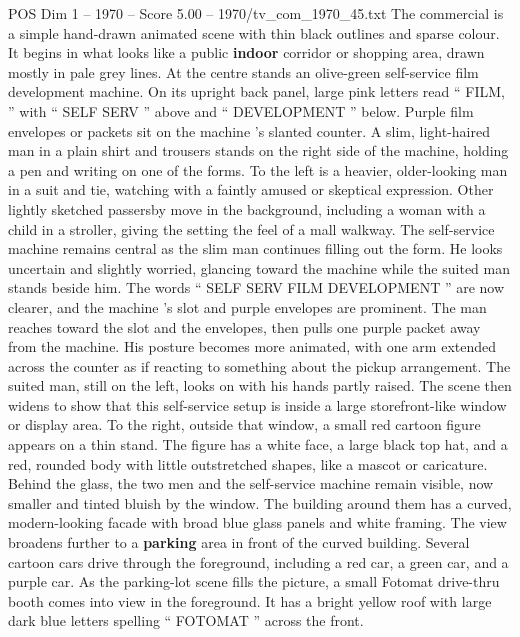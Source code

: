 \begin{textsample}{POS Dim 1 – 1970 – Score 5.00 – 1970/tv\_com\_1970\_45.txt}  \label{ex:f1_pos_067}
The commercial is a simple hand-drawn animated scene with thin black outlines and sparse colour.
It begins in what looks like a public \textbf{indoor} corridor or shopping area, drawn mostly in pale grey lines.
At the centre stands an olive-green self-service film development machine.
On its upright back panel, large pink letters read “ FILM, ” with “ SELF SERV ” above and “ DEVELOPMENT ” below.
Purple film envelopes or packets sit on the machine ’s slanted counter.
A slim, light-haired man in a plain shirt and trousers stands on the right side of the machine, holding a pen and writing on one of the forms.
To the left is a heavier, older-looking man in a suit and tie, watching with a faintly amused or skeptical expression.
Other lightly sketched passersby move in the background, including a woman with a child in a stroller, giving the setting the feel of a mall walkway.
The self-service machine remains central as the slim man continues filling out the form.
He looks uncertain and slightly worried, glancing toward the machine while the suited man stands beside him.
The words “ SELF SERV FILM DEVELOPMENT ” are now clearer, and the machine ’s slot and purple envelopes are prominent.
The man reaches toward the slot and the envelopes, then pulls one purple packet away from the machine.
His posture becomes more animated, with one arm extended across the counter as if reacting to something about the pickup arrangement.
The suited man, still on the left, looks on with his hands partly raised.
The scene then widens to show that this self-service setup is inside a large storefront-like window or display area.
To the right, outside that window, a small red cartoon figure appears on a thin stand.
The figure has a white face, a large black top hat, and a red, rounded body with little outstretched shapes, like a mascot or caricature.
Behind the glass, the two men and the self-service machine remain visible, now smaller and tinted bluish by the window.
The building around them has a curved, modern-looking facade with broad blue glass panels and white framing.
The view broadens further to a \textbf{parking} area in front of the curved building.
Several cartoon cars drive through the foreground, including a red car, a green car, and a purple car.
As the parking-lot scene fills the picture, a small Fotomat drive-thru booth comes into view in the foreground.
It has a bright yellow roof with large dark blue letters spelling “ FOTOMAT ” across the front.

\end{textsample}
